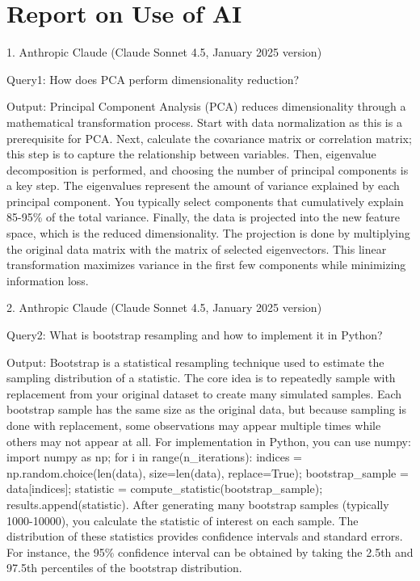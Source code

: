\documentclass{mcmthesis}
\begin{document}
\clearpage
\pagestyle{empty} %
\section*{Report on Use of AI}
1. Anthropic Claude (Claude Sonnet 4.5, January 2025 version)

Query1: How does PCA perform dimensionality reduction?

Output: Principal Component Analysis (PCA) reduces dimensionality through a mathematical transformation process. Start with data normalization as this is a prerequisite for PCA. Next, calculate the covariance matrix or correlation matrix; this step is to capture the relationship between variables. Then, eigenvalue decomposition is performed, and choosing the number of principal components is a key step. The eigenvalues represent the amount of variance explained by each principal component. You typically select components that cumulatively explain 85-95\% of the total variance. Finally, the data is projected into the new feature space, which is the reduced dimensionality. The projection is done by multiplying the original data matrix with the matrix of selected eigenvectors. This linear transformation maximizes variance in the first few components while minimizing information loss.

2. Anthropic Claude (Claude Sonnet 4.5, January 2025 version)

Query2: What is bootstrap resampling and how to implement it in Python?

Output: Bootstrap is a statistical resampling technique used to estimate the sampling distribution of a statistic. The core idea is to repeatedly sample with replacement from your original dataset to create many simulated samples. Each bootstrap sample has the same size as the original data, but because sampling is done with replacement, some observations may appear multiple times while others may not appear at all. For implementation in Python, you can use numpy: import numpy as np; for i in range(n\_iterations): indices = np.random.choice(len(data), size=len(data), replace=True); bootstrap\_sample = data[indices]; statistic = compute\_statistic(bootstrap\_sample); results.append(statistic). After generating many bootstrap samples (typically 1000-10000), you calculate the statistic of interest on each sample. The distribution of these statistics provides confidence intervals and standard errors. For instance, the 95\% confidence interval can be obtained by taking the 2.5th and 97.5th percentiles of the bootstrap distribution.
\end{document}
